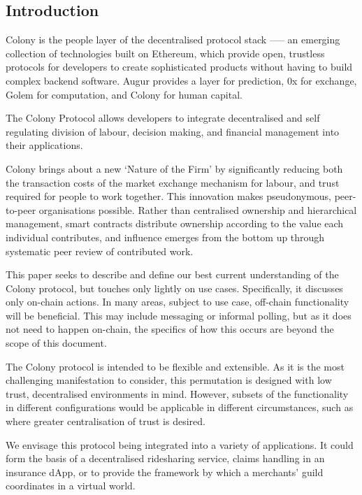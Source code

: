 \subsection*{Introduction}

Colony is the people layer of the decentralised protocol stack --— an emerging collection of technologies built on Ethereum, which provide open, trustless protocols for developers to create sophisticated products without having to build complex backend software. Augur provides a layer for prediction, 0x for exchange, Golem for computation, and Colony for human capital.

The Colony Protocol allows developers to integrate decentralised and self regulating division of labour, decision making, and financial management into their applications.

Colony brings about a new `Nature of the Firm' \cite{The-Nature-of-the-Firm} by significantly reducing both the transaction costs of the market exchange mechanism for labour, and trust required for people to work together. This innovation makes pseudonymous, peer-to-peer organisations possible. Rather than centralised ownership and hierarchical management, smart contracts distribute ownership according to the value each individual contributes, and influence emerges from the bottom up through systematic peer review of contributed work.

This paper seeks to describe and define our best current understanding of the Colony protocol, but touches only lightly on use cases. Specifically, it discusses only on-chain actions. In many areas, subject to use case, off-chain functionality will be beneficial. This may include messaging or informal polling, but as it does not need to happen on-chain, the specifics of how this occurs are beyond the scope of this document.

The Colony protocol is intended to be flexible and extensible. As it is the most challenging manifestation to consider, this permutation is designed with low trust, decentralised environments in mind. However, subsets of the functionality in different configurations would be applicable in different circumstances, such as where greater centralisation of trust is desired.

We envisage this protocol being integrated into a variety of applications. It could form the basis of a decentralised ridesharing service, claims handling in an insurance dApp, or to provide the framework by which a merchants’ guild coordinates in a virtual world.








